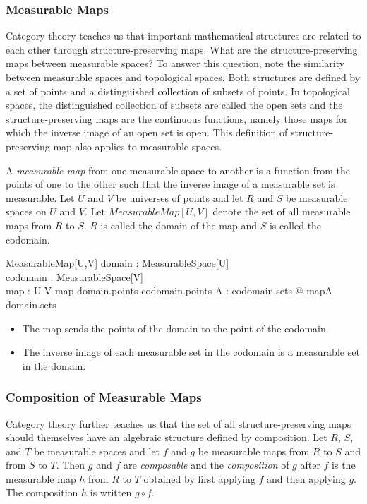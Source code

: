 \documentclass{article}
\begin{document}
\subsubsection{Measurable Maps}

Category theory teaches us that important mathematical structures are related to each other through structure-preserving maps.
What are the structure-preserving maps between measurable spaces?
To answer this question, note the similarity between measurable spaces and topological spaces.
Both structures are defined by a set of points and a distinguished collection of subsets of points.
In topological spaces, the distinguished collection of subsets are called the open sets and the structure-preserving maps are the continuous
functions, namely those maps for which the inverse image of an open set is open.
This definition of structure-preserving map also applies to measurable spaces.

A {\it measurable map} from one measurable space to another is a function from the points of one to the other such that the inverse image
of a measurable set is measurable.
Let $U$ and $V$ be universes of points and let $R$ and $S$ be measurable spaces on $U$ and $V$. 
Let $MeasurableMap[U,V]$ denote the set of all measurable maps from $R$ to $S$.
$R$ is called the domain of the map and $S$ is called the codomain.
\begin{schema}{MeasurableMap}[U,V]
	domain : MeasurableSpace[U] \\
	codomain : MeasurableSpace[V] \\
	map : U \pfun V
\where
	map \in domain.points \fun codomain.points
\also
	\forall A : codomain.sets @ map\inv\limg A \rimg \in domain.sets
\end{schema}
\begin{itemize}
\item The map sends the points of the domain to the point of the codomain.
\item The inverse image of each measurable set in the codomain is a measurable set in the domain.
\end{itemize}

\subsubsection{Composition of Measurable Maps}

Category theory further teaches us that the set of all structure-preserving maps should themselves have an algebraic structure
defined by composition.
Let $R$, $S$, and $T$ be measurable spaces and let $f$ and $g$ be measurable maps from $R$ to $S$ and from $S$ to $T$.
Then $g$ and $f$ are {\it composable} and
the {\it composition} of $g$ after $f$ is the measurable map $h$ from $R$ to $T$ obtained by first applying $f$ and then applying $g$.
The composition $h$ is written $g \circ f$.
\end{document}
